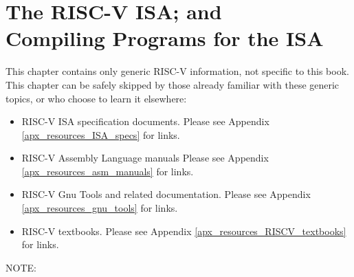 

\chapter{The RISC-V ISA; and\\Compiling Programs for the ISA}



\setcounter{page}{1}
\renewcommand{\thepage}{\arabic{chapter}-\arabic{page}}

\label{ch_ISA}


This chapter contains only generic RISC-V information, not specific to
this book.  This chapter can be safely skipped by those already
familiar with these generic topics, or who choose to learn it
elsewhere:

\begin{itemize}

\item RISC-V ISA specification documents.
      Please see Appendix \ref{apx_resources_ISA_specs} for links.

\item RISC-V Assembly Language manuals
      Please see Appendix \ref{apx_resources_asm_manuals} for links.

\item RISC-V Gnu Tools and related documentation.
      Please see Appendix \ref{apx_resources_gnu_tools} for links.

\item RISC-V textbooks.
      Please see Appendix \ref{apx_resources_RISCV_textbooks} for links.

\end{itemize}

\vspace{1cm}

NOTE: 

